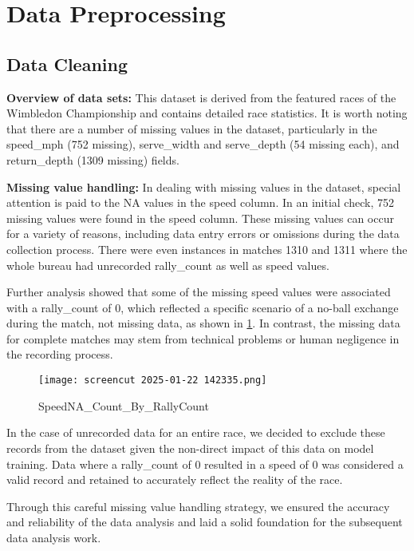 \documentclass{mcmthesis}
\begin{document}
\section{Data Preprocessing} 

\subsection{Data Cleaning}

{\bf Overview of data sets:} This dataset is derived from the featured races of the Wimbledon Championship and contains detailed race statistics.
 It is worth noting that there are a number of missing values in the dataset, particularly in the speed\_mph (752 missing), serve\_width and
serve\_depth (54 missing each), and return\_depth (1309 missing) fields. 

{\bf Missing value handling: }In dealing with missing values in the dataset, special attention is
paid to the NA values in the speed column. In an initial check, 752 missing values were found in
the speed column. These missing values can occur for a variety of reasons, including data entry
errors or omissions during the data collection process. There were even instances in matches 1310
and 1311 where the whole bureau had unrecorded rally\_count as well as speed values. 

Further analysis showed that some of the missing speed values were associated with a
rally\_count of 0, which reflected a specific scenario of a no-ball exchange during the match, not
missing data, as shown in \ref{Figure 1}. In contrast, the missing data for complete matches may stem
from technical problems or human negligence in the recording process.

\begin{figure}[htbp]
    \centering
    \texttt{[image: screencut 2025-01-22 142335.png]}
    \caption{SpeedNA\_Count\_By\_RallyCount} \label{Figure 1}
\end{figure}


In the case of unrecorded data for an entire race, we decided to exclude these records from
the dataset given the non-direct impact of this data on model training. Data where a rally\_count of
0 resulted in a speed of 0 was considered a valid record and retained to accurately reflect the
reality of the race. 

Through this careful missing value handling strategy, we ensured the accuracy and reliability
of the data analysis and laid a solid foundation for the subsequent data analysis work. 
\end{document}
